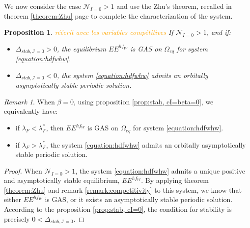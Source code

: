 \documentclass{article}
\newcommand{\lfw}{\lambda_{F}}
\newcommand{\lfw}{\lambda_{F}}
\newcommand{\cI}{\mathcal{I}}
\newcommand{\vdeux}[1]{\textcolor{orange}{#1}}
\newtheorem{prop}[theorem]{Proposition}
\theoremstyle{definition}
\theoremstyle{remark}
\newtheorem{remark}[theorem]{Remark}
\begin{document}
%
%

We now consider the case $\mathcal{N}_{I = 0} > 1$ and use the Zhu's  theorem, recalled in theorem \ref{theorem:Zhu} page \pageref{theorem:Zhu} to complete the characterization of the system.

\begin{prop}
\vdeux{réécrit avec les variables compétitives}
\label{prop:limitCycle, cI=0}
If $\mathcal{N}_{I =0} > 1$, and if:
\begin{itemize}
\item $\Delta_{stab, \cI =0} > 0$, the equilibrium $EE^{hf_W}$ is GAS on $\Omega_{eq}$ for system \eqref{equation:hdfwhw}.
\item $\Delta_{stab, \cI =0} < 0$, the system \eqref{equation:hdfwhw} admits an orbitally asymptotically stable periodic solution.
\end{itemize}
\end{prop}

\begin{remark}
When $\beta = 0$, using proposition \ref{prop:stab, cI=beta=0}, we equivalently have:
\begin{itemize}
\item if $\lfw <  \lfw^*$, then $EE^{hf_W}$ is GAS on $\Omega_{eq}$ for system \eqref{equation:hdfwhw}.
\item if $\lfw  > \lfw^*$, the system \eqref{equation:hdfwhw} admits an orbitally asymptotically stable periodic solution.
\end{itemize}
\end{remark}

\begin{proof}
When $\mathcal{N}_{I =0} > 1$, the system \eqref{equation:hdfwhw} admits a unique positive and asymptotically stable equilibrium, $EE^{hf_W}$. By applying theorem \ref{theorem:Zhu} and remark \ref{remark:competitivity} to this system, we know that either $EE^{hf_W}$ is GAS, or it exists an asymptotically stable periodic solution. According to the proposition \ref{prop:stab, cI=0}, the condition for stability is precisely $0 < \Delta_{stab, \cI =0}$. 
\end{proof}
\end{document}
